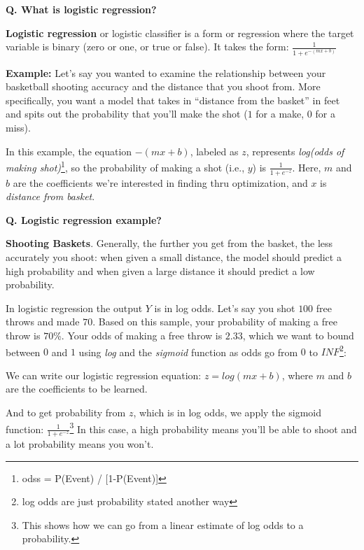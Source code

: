 \begin{frame}[fragile]{\textbf{Q. What is logistic regression?}}
  \begin{wideitemize}
  \item \textbf{Logistic regression} or logistic classifier is a form or
    regression where the target variable is binary (zero or one, or true or
    false). It takes the form: $\frac{1}{1 + e^{-(mx + b)}}$
  \item \textbf{Example:} Let's say you wanted to examine the relationship between
    your basketball shooting accuracy and the distance that you shoot from. More
    specifically, you want a model that takes in ``distance from the basket'' in
    feet and spits out the probability that you'll make the shot ($1$ for a make, $0$ for a miss).
  \begin{wideitemize}\vspace{2mm}\small
    \item In this example, the equation $-(mx + b)$, labeled as $z$, represents
    \textit{log(odds of making shot)}\footnote{odss = P(Event) / [1-P(Event)]},
    so the probability of making a shot (i.e., $y$) is $\frac{1}{1 + e^{-z}}$.
    Here, $m$ and $b$ are the coefficients we're interested in finding thru optimization,
    and $x$ is \textit{distance from basket}.
  \end{wideitemize}
  \end{wideitemize}
\end{frame}


\begin{frame}[fragile]{\textbf{Q. Logistic regression example?}}
  \begin{wideitemize}
  \item \textbf{Shooting Baskets}. Generally, the further you get from the basket,
    the less accurately you shoot: when given a small distance, the model should
    predict a high probability and when given a large distance it should predict
    a low probability.
    \begin{wideitemize}\vspace{2mm}\small
    \item In logistic regression the output $Y$ is in log odds. Let's say you shot
      $100$ free throws and made $70$. Based on this sample, your probability of
      making a free throw is $70$\%. Your odds of making a free throw is $2.33$,
      which we want to bound between $0$ and $1$ using \textit{log} and the
      \textit{sigmoid} function as odds go from $0$ to $INF$\footnote{log odds
        are just probability stated another way}:
    \item We can write our logistic regression equation: $z = log(mx + b)$,
      where $m$ and $b$ are the coefficients to be learned.
    \item And to get probability from $z$, which is in log odds, we apply the
      sigmoid function: $\frac{1}{1 + e^{-z}}$\footnote{This shows how we can go
        from a linear estimate of log odds to a probability.} In this case, a
      high probability means you'll be able to shoot and a lot probability means you won't.
  \end{wideitemize}
  \end{wideitemize}
\end{frame}

